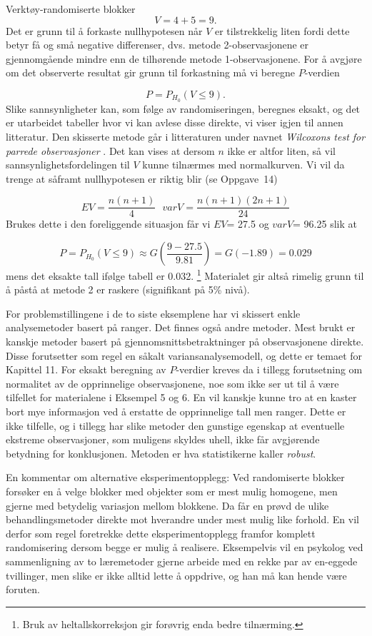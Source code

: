\begin{eksempel}{Verktøy-randomiserte blokker}
\[         V = 4 + 5 = 9.                \]
Det er grunn til å forkaste nullhypotesen når $V$ er 
tilstrekkelig liten fordi dette betyr få og små negative
differenser, dvs. metode 2-observasjonene er gjennomgående mindre
enn de tilhørende metode 1-observasjonene.  For å avgjøre
om det observerte resultat gir grunn til forkastning må vi beregne
$P$-verdien

\[  P=P_{H_0}(V\leq 9).         \]
Slike sannsynligheter kan, som følge av randomiseringen, beregnes
eksakt, og det er utarbeidet tabeller hvor vi kan avlese disse direkte,
vi viser igjen til annen litteratur.  Den skisserte metode går i
litteraturen under navnet {\em Wilcoxons test for parrede observasjoner}
.
Det kan vises at dersom $n$ ikke er altfor liten, så vil 
sannsynlighetsfordelingen til $V$ kunne tilnærmes med normalkurven.
Vi vil da trenge at såframt nullhypotesen er riktig blir (se Oppgave~14)

\[ EV=\frac{n(n+1)}{4} \mbox{\ \ \ } varV=\frac{n(n+1)(2n+1)}{24}     \]
Brukes dette i den foreliggende situasjon får vi $EV$= 27.5 og
$varV$= 96.25 slik at

\[  P=P_{H_0}(V\leq 9)\approx G(\frac{9-27.5}{9.81})=G(-1.89)=0.029 \]
mens det eksakte tall ifølge tabell er 0.032. \footnote {Bruk av
heltallskorreksjon gir forøvrig enda bedre tilnærming.}
Materialet gir altså rimelig grunn til å påstå at metode
2 er raskere (signifikant på 5\% nivå).
\end{eksempel}

For problemstillingene i de to siste eksemplene har vi skissert enkle
ana\-ly\-se\-me\-toder basert på ranger.  Det finnes også andre metoder.
Mest brukt er kanskje metoder basert på gjennomsnittsbetraktninger
på observasjonene direkte.  Disse forutsetter som regel en såkalt
variansanalysemodell,  og dette er temaet for Kapittel 11.  For eksakt
beregning av $P$-verdier kreves da i tillegg forutsetning om 
normalitet av de opprinnelige observasjonene, noe som ikke ser ut til 
å være tilfellet for materialene i Eksempel 5 og 6.  En vil
kanskje kunne tro at en kaster bort mye informasjon ved å erstatte
de opprinnelige tall men ranger.  Dette er ikke tilfelle, og i tillegg
har slike metoder den gunstige egenskap at eventuelle ekstreme 
observasjoner, som muligens skyldes uhell, ikke får avgjørende
betydning for konklusjonen.  Metoden er hva statistikerne kaller 
{\em robust}.

En kommentar om alternative eksperimentopplegg:  Ved randomiserte 
blokker forsøker en å velge blokker med objekter som er mest
mulig homogene, men gjerne med betydelig variasjon mellom blokkene.
Da får en prøvd de ulike behandlingsmetoder direkte mot hverandre
under mest mulig like forhold.  En vil derfor som regel foretrekke
dette eksperimentopplegg framfor komplett randomisering dersom begge
er mulig å realisere.  Eksempelvis vil en psykolog ved sammenligning
av to læremetoder gjerne arbeide med en rekke par av en-eggede 
tvillinger, men slike er ikke alltid lette å oppdrive, og han må
kan hende være foruten.

